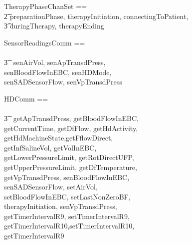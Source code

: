 
\begin{circus}\circchanset TherapyPhaseChanSet ==
\\\t2 \lchanset preparationPhase, therapyInitiation, connectingToPatient,
\\\t3 duringTherapy, therapyEnding \rchanset
\end{circus}
\begin{circus}
  \circchanset SensorReadingsComm ==\\
  \\\t3 \lchanset~senAirVol, senApTransdPress, \\
      senBloodFlowInEBC, senHDMode, \\
      senSADSensorFlow, senVpTransdPress~\rchanset
\end{circus}
\begin{circus}
  \circchanset HDComm ==\\
  \\\t3 \lchanset~getApTransdPress, getBloodFlowInEBC, \\
    getCurrentTime, getDfFlow, getHdActivity, \\
    getHdMachineState,getFflowDirect, \\
    getInfSalineVol, getVolInEBC,\\
    getLowerPressureLimit, getRotDirectUFP, \\
    getUpperPressureLimit, getDfTemperature, \\
    getVpTransdPress, senBloodFlowInEBC, \\
    senSADSensorFlow, setAirVol, \\
    setBloodFlowInEBC, setLastNonZeroBF, \\
    therapyInitiation, senVpTransdPress, \\
    getTimerIntervalR9, setTimerIntervalR9, \\
    getTimerIntervalR10,setTimerIntervalR10,\\
    getTimerIntervalR9~\rchanset
\end{circus}

